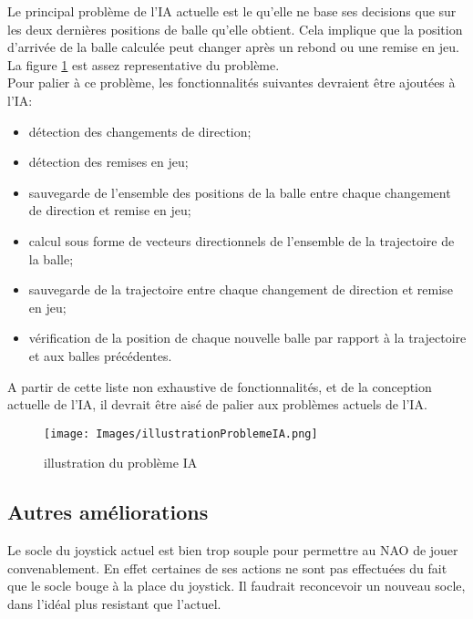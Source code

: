     \par Le principal problème de l'IA actuelle est le qu'elle ne base ses decisions que sur les deux dernières positions de balle qu'elle obtient.
    Cela implique que la position d'arrivée de la balle calculée peut changer après un rebond ou une remise en jeu.
    La figure \ref{fig:illustration du problème IA} est assez representative du problème. \\
    Pour palier à ce problème, les fonctionnalités suivantes devraient être ajoutées à l'IA:
    \begin{itemize}
      \item détection des changements de direction;
      \item détection des remises en jeu;
      \item sauvegarde de l'ensemble des positions de la balle entre chaque changement de direction et remise en jeu;
      \item calcul sous forme de vecteurs directionnels de l'ensemble de la trajectoire de la balle;
      \item sauvegarde de la trajectoire entre chaque changement de direction et remise en jeu;
      \item vérification de la position de chaque nouvelle balle par rapport à la trajectoire et aux balles précédentes.
    \end{itemize}
    A partir de cette liste non exhaustive de fonctionnalités, et de la conception actuelle de l'IA, il devrait être aisé de palier aux problèmes actuels de l'IA.

    \begin{figure}[!h]
      \caption{illustration du problème IA}
      \label{fig:illustration du problème IA}
      \centering
      \texttt{[image: Images/illustrationProblemeIA.png]}
    \end{figure}


  \subsection{Autres améliorations}
  \label{sub:Autres améliorations}
    \par Le socle du joystick actuel est bien trop souple pour permettre au NAO de jouer convenablement.
    En effet certaines de ses actions ne sont pas effectuées du fait que le socle bouge à la place du joystick.
    Il faudrait reconcevoir un nouveau socle, dans l'idéal plus resistant que l'actuel.\\


